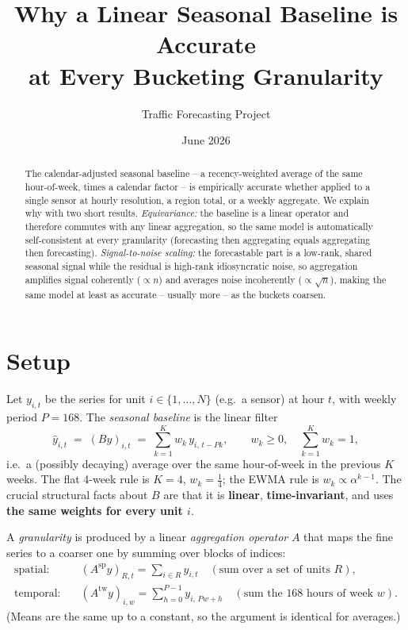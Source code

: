 \documentclass[11pt]{article}
\title{\textbf{Why a Linear Seasonal Baseline is Accurate\\ at Every Bucketing Granularity}}
\author{Traffic Forecasting Project}
\date{June 2026}
\theoremstyle{plain}
\theoremstyle{remark}
\begin{document}
\maketitle

\begin{abstract}
\noindent
The calendar-adjusted seasonal baseline -- a recency-weighted average of the same
hour-of-week, times a calendar factor -- is empirically accurate whether applied to
a single sensor at hourly resolution, a region total, or a weekly aggregate. We
explain why with two short results. \emph{Equivariance:} the baseline is a linear
operator and therefore commutes with any linear aggregation, so the same model is
automatically self-consistent at every granularity (forecasting then aggregating
equals aggregating then forecasting). \emph{Signal-to-noise scaling:} the
forecastable part is a low-rank, shared seasonal signal while the residual is
high-rank idiosyncratic noise, so aggregation amplifies signal coherently
($\propto n$) and averages noise incoherently ($\propto \sqrt{n}$), making the same
model at least as accurate -- usually more -- as the buckets coarsen.
\end{abstract}

\section{Setup}

Let $y_{i,t}$ be the series for unit $i\in\{1,\dots,N\}$ (e.g.\ a sensor) at hour
$t$, with weekly period $P=168$. The \emph{seasonal baseline} is the linear filter
\begin{equation}
\hat y_{i,t} \;=\; (B y)_{i,t} \;=\; \sum_{k=1}^{K} w_k\, y_{i,\,t-Pk},
\qquad w_k\ge 0,\quad \sum_{k=1}^{K} w_k = 1,
\label{eq:B}
\end{equation}
i.e.\ a (possibly decaying) average over the same hour-of-week in the previous $K$
weeks. The flat 4-week rule is $K=4$, $w_k=\tfrac14$; the EWMA rule is
$w_k\propto\alpha^{k-1}$. The crucial structural facts about $B$ are that it is
\textbf{linear}, \textbf{time-invariant}, and uses \textbf{the same weights for
every unit $i$}.

A \emph{granularity} is produced by a linear \emph{aggregation operator} $A$ that
maps the fine series to a coarser one by summing over blocks of indices:
\begin{align}
\text{spatial:}&\quad (A^{\mathrm{sp}} y)_{R,t} = \sum_{i\in R} y_{i,t}
  \quad(\text{sum over a set of units }R),\\
\text{temporal:}&\quad (A^{\mathrm{tw}} y)_{i,w} = \sum_{h=0}^{P-1} y_{i,\,Pw+h}
  \quad(\text{sum the }168\text{ hours of week }w).
\end{align}
(Means are the same up to a constant, so the argument is identical for averages.)
\end{document}
